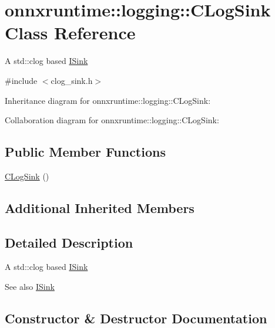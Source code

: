 \hypertarget{classonnxruntime_1_1logging_1_1CLogSink}{}\section{onnxruntime\+:\+:logging\+:\+:C\+Log\+Sink Class Reference}
\label{classonnxruntime_1_1logging_1_1CLogSink}


A std\+::clog based \mbox{\hyperlink{classonnxruntime_1_1logging_1_1ISink}{I\+Sink}}  




{\ttfamily \#include $<$clog\+\_\+sink.\+h$>$}



Inheritance diagram for onnxruntime\+:\+:logging\+:\+:C\+Log\+Sink\+:


Collaboration diagram for onnxruntime\+:\+:logging\+:\+:C\+Log\+Sink\+:
\subsection*{Public Member Functions}
\begin{DoxyCompactItemize}
\item 
\mbox{\hyperlink{classonnxruntime_1_1logging_1_1CLogSink_a5ab4c0099be654eaf1a6aaadf1f1a595}{C\+Log\+Sink}} ()
\end{DoxyCompactItemize}
\subsection*{Additional Inherited Members}


\subsection{Detailed Description}
A std\+::clog based \mbox{\hyperlink{classonnxruntime_1_1logging_1_1ISink}{I\+Sink}} 

\begin{DoxySeeAlso}{See also}
\mbox{\hyperlink{classonnxruntime_1_1logging_1_1ISink}{I\+Sink}}


\end{DoxySeeAlso}


\subsection{Constructor \& Destructor Documentation}
\mbox{\label{classonnxruntime_1_1logging_1_1CLogSink_a5ab4c0099be654eaf1a6aaadf1f1a595}} 
